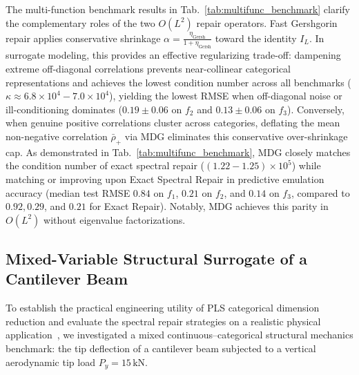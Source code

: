 \documentclass[default,sn-mathphys,Numbered]{sn-jnl}
\theoremstyle{thmstyleone}
\theoremstyle{thmstylethree}
\theoremstyle{thmstyletwo}
\begin{document}
The multi-function benchmark results in Tab.~\ref{tab:multifunc_benchmark} clarify the complementary roles of the two $O(L^2)$ repair operators. Fast Gershgorin repair applies conservative shrinkage $\alpha = \frac{\eta_{\mathrm{Gersh}}}{1 + \eta_{\mathrm{Gersh}}}$ toward the identity $I_L$. In surrogate modeling, this provides an effective regularizing trade-off: dampening extreme off-diagonal correlations prevents near-collinear categorical representations and achieves the lowest condition number across all benchmarks ($\kappa \approx 6.8\times 10^4 - 7.0\times 10^4$), yielding the lowest RMSE when off-diagonal noise or ill-conditioning dominates ($0.19 \pm 0.06$ on $f_2$ and $0.13 \pm 0.06$ on $f_3$). Conversely, when genuine positive correlations cluster across categories, deflating the mean non-negative correlation $\bar{\rho}_+$ via MDG eliminates this conservative over-shrinkage cap. As demonstrated in Tab.~\ref{tab:multifunc_benchmark}, MDG closely matches the condition number of exact spectral repair ($(1.22 - 1.25) \times 10^5$) while matching or improving upon Exact Spectral Repair in predictive emulation accuracy (median test RMSE $0.84$ on $f_1$, $0.21$ on $f_2$, and $0.14$ on $f_3$, compared to $0.92, 0.29$, and $0.21$ for Exact Repair). Notably, MDG achieves this parity in $O(L^2)$  without eigenvalue factorizations.

\subsection{Mixed-Variable Structural Surrogate of a Cantilever Beam}
\label{sec:cantilever_beam}\label{subsec:cantilever_benchmark}

To establish the practical engineering utility of PLS categorical dimension reduction and evaluate the spectral repair strategies on a realistic physical application~\citep{chin1998partial}, we investigated a mixed continuous--categorical structural mechanics benchmark: the tip deflection of a cantilever beam subjected to a vertical aerodynamic tip load $P_y = 15\,\mathrm{kN}$.
\end{document}
